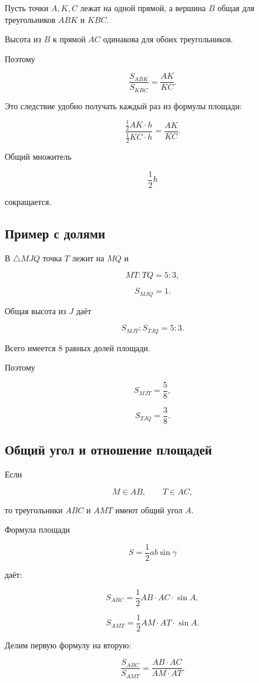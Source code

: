\documentclass[a4paper,12pt]{article}
\begin{document}
Пусть точки $A,K,C$ лежат на одной прямой,
а вершина $B$ общая для треугольников
$ABK$ и $KBC$.

Высота из $B$ к прямой $AC$
одинакова для обоих треугольников.

Поэтому

\[
\frac{S_{ABK}}{S_{KBC}}
=
\frac{AK}{KC}.
\]

Это следствие удобно получать
каждый раз из формулы площади:

\[
\frac{
  \frac12 AK\cdot h
}{
  \frac12 KC\cdot h
}
=
\frac{AK}{KC}.
\]

Общий множитель

\[
\frac12 h
\]

сокращается.

\subsection{Пример с долями}

В $\triangle MJQ$ точка $T$ лежит на $MQ$ и

\[
MT:TQ=5:3,
\]

\[
S_{MJQ}=1.
\]

Общая высота из $J$ даёт

\[
S_{MJT}:S_{TJQ}
=
5:3.
\]

Всего имеется $8$ равных долей площади.

Поэтому

\[
\boxed{S_{MJT}=\frac58},
\]

\[
\boxed{S_{TJQ}=\frac38}.
\]

\subsection{Общий угол и отношение площадей}

Если

\[
M\in AB,
\qquad
T\in AC,
\]

то треугольники $ABC$ и $AMT$
имеют общий угол $A$.

Формула площади

\[
S
=
\frac12 ab\sin\gamma
\]

даёт:

\[
S_{ABC}
=
\frac12
AB\cdot AC\cdot\sin A,
\]

\[
S_{AMT}
=
\frac12
AM\cdot AT\cdot\sin A.
\]

Делим первую формулу на вторую:

\[
\boxed{
\frac{S_{ABC}}{S_{AMT}}
=
\frac{AB\cdot AC}{AM\cdot AT}
}.
\]
\end{document}
